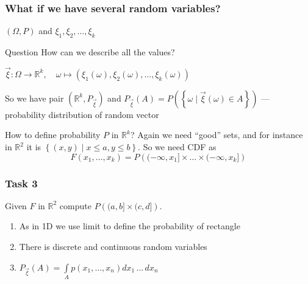 \documentclass[fullscreen=true, bookmarks=true, hyperref={pdfencoding=unicode}]{beamer}
\begin{document}
\begin{frame}
  \frametitle{What if we have several random variables?}
  $(\Omega, P)$ and $\xi_1, \xi_2, \dots, \xi_k$

  \begin{block}{Question}
    How can we describe all the values?
  \end{block}

  \pause
  \vspace{0.5cm}
  $\vec{\xi}: \Omega \to \mathbb{R}^k, \quad \omega \mapsto (\xi_1(\omega), \xi_2(\omega), \dots, \xi_k(\omega))$

  So we have pair $(\mathbb{R}^k, P_{\vec{\xi}})$ and 
  $P_{\vec{\xi}}(A) = P\left(\left\{\omega \mid \vec{\xi}(\omega) \in A \right\}\right)$ — probability distribution of random vector

  \pause
  \vspace{0.5cm}
  How to define probability $P$ in $\mathbb{R}^k$? Again we need ``good'' sets, 
  and for instance in $\mathbb{R}^2$ it is $\left\{(x,y)\mid x \leq a, y \leq b\right\}$.
  So we need CDF as 
  $$F(x_1, \dots, x_k) = P\left((-\infty, x_1]\times\dots\times(-\infty, x_k]\right)$$

\end{frame}


\begin{frame}
  \frametitle{Task 3}
  Given $F$ in $\mathbb{R}^2$ compute $P\left((a, b]\times(c, d]\right)$.

  \centering

  \begin{enumerate}
    \pause\item As in 1D we use limit to define the probability of rectangle
    \pause\item There is discrete and continuous random variables
    \pause\item $P_{\vec{\xi}}(A) = \int\limits_{A} p(x_1, \dots, x_n) dx_1\,\dots\,dx_n$
  \end{enumerate}
\end{frame}
\end{document}
